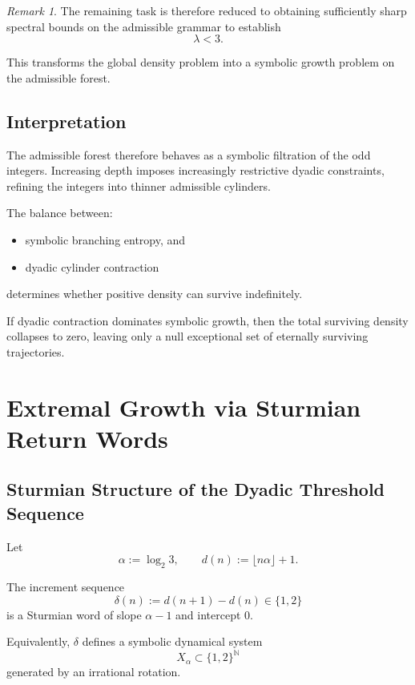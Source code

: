 \documentclass[12pt, oneside]{article}
\numberwithin{equation}{section}
\theoremstyle{definition}
\theoremstyle{plain}
\theoremstyle{remark}
\newtheorem*{remark}{Remark}
\begin{document}
\begin{remark}
The remaining task is therefore reduced to obtaining sufficiently sharp
spectral bounds on the admissible grammar to establish
\[
\lambda<3.
\]

This transforms the global density problem into a symbolic growth
problem on the admissible forest.
\end{remark}

\subsection{Interpretation}

The admissible forest therefore behaves as a symbolic filtration of the
odd integers. Increasing depth imposes increasingly restrictive dyadic
constraints, refining the integers into thinner admissible cylinders.

The balance between:
\begin{itemize}
\item symbolic branching entropy, and
\item dyadic cylinder contraction
\end{itemize}
determines whether positive density can survive indefinitely.

If dyadic contraction dominates symbolic growth, then the total
surviving density collapses to zero, leaving only a null exceptional
set of eternally surviving trajectories.

\section{Extremal Growth via Sturmian Return Words}

\subsection{Sturmian Structure of the Dyadic Threshold Sequence}

Let
\[
\alpha := \log_2 3,
\qquad
d(n) := \lfloor n\alpha \rfloor + 1.
\]

The increment sequence
\[
\delta(n) := d(n+1) - d(n) \in \{1,2\}
\]
is a Sturmian word of slope $\alpha - 1$ and intercept $0$.

Equivalently, $\delta$ defines a symbolic dynamical system
\[
X_\alpha \subset \{1,2\}^{\mathbb{N}}
\]
generated by an irrational rotation.
\end{document}
